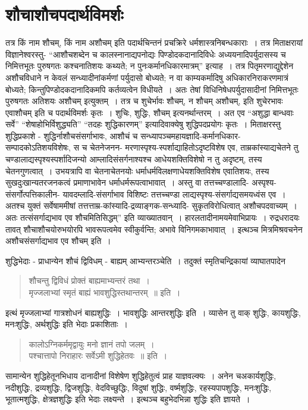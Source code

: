 {\section*{शौचाशौचपदार्थविमर्शः}

तत्र किं नाम शौचम्, किं नाम अशौचम् इति पदार्थचिन्तनं प्रचक्रिरे धर्मशास्त्रनिबन्ध\-काराः~। तत्र मिताक्षरायां विज्ञानेश्वरस्तु- “आशौचशब्देन च कालस्नानाद्यपनोद्यः पिण्डोदकदानादि\-विधेः अध्ययनादिपर्युदासस्य च निमित्तभूतः पुरुषगतः कश्चनातिशयः कथ्यते; न पुनः\break कर्मानधिकारमात्रम्” इत्याह~। तत्र पितृमरणाद्युद्देशेन अशौचविधाने न केवलं सन्ध्यादीनां\break कर्मणां पर्युदासो बोध्यते; न वा काम्यकर्मादिषु अधिकारनिराकरणमात्रं बोध्यते; किन्तु\break पिण्डोदकदानादिकमपि कर्तव्यत्वेन विधीयते~। अतः तेषां विधिनिषेधपर्युदासादीनां निमित्त\-भूतः पुरुषगतः अतिशयः अशौचम् इत्युक्तम्~। तत्र च शुचेर्भावः शौचम्, न शौचम् अशौचम्, इति शुचेरभावः एवाशौचम् इति च पदार्थविमर्शः कृतः~। शुचिः, शुद्धिः, शौचम् इत्यनर्थान्तरम्~। अत एव “अशुद्धा बान्धवाः सर्वे” “शेषाहोभिर्विशुद्ध्यति” “तदहः शुद्धिकारणम्” इत्यादिवाक्येषु शुद्धिपदप्रयोगः कृतः~। मिताक्षरस्तु शुद्धिप्रकाशे - शुद्धिर्नाशौच\-संसर्गाभावः, आशौचं च सन्ध्यापञ्चमहायज्ञादि-कर्मानधिकार-सम्पादकोऽतिशयविशेषः, स च चेतने\break जनन- मरणास्पृश्य-स्पर्शाद्याहितोऽदृष्टविशेष एव, ताम्रकांस्याद्यचेतने तु चण्डालाद्यस्पृश्यस्पर्शादिजन्यो आम्लादिसंसर्गनाश्यश्च आधेयशक्तिविशेषो न तु अदृष्टम्, तस्य चेतनगुणत्वात्~। उभयत्रापि वा चेतनाचेतनयोः धर्माधर्मविलक्षणाधेयशक्तिविशेष एवातिशयः, तस्य सुखदुःखान्यतरजनकत्वं प्रमाणाभावेन धर्माधर्मरूपत्वाभावात्~। अस्तु वा तत्तच्चण्डालादि- अस्पृश्य-संसर्गोत्पत्तिकालीन- यावदम्लादि-संसर्गाभाव\- विशिष्टः तत्तच्चण्डा लाद्यस्पृश्य-\break संसर्गाद्यसमयध्वंस एव~। अतश्च युक्तं सर्वेषाममीषां तत्तत्ताम्र-कांस्यादि-द्रव्याङ्गक-\break सन्ध्यादि- सुकृतविरोधित्वात् अशौचपदवाच्यम्~। अतः तत्संसर्गाद्यभाव एव शौचमिति\break सिद्धम्”  इति व्याख्यातवान्~। हारलतादीनामयमेवाभिप्रायः~। रुद्रधरादयः तावत् शौचाशौचयोरुभयोरपि भावरूपत्वमेव स्वीकुर्वन्ति; अभावे विनिगमकाभावात्~।  \hbox{इत्थञ्च} मित्रमिश्रवचनेन अशौचसंसर्गाद्यभाव एव शौचम् इति~। 

शुद्धिभेदाः - प्राधान्येन शौचं द्विविधम् - बाह्यम् आभ्यन्तरञ्चेति~। तदुक्तं स्मृतिचन्द्रिकायां व्याघातपादेन \enginline{-}
\begin{verse}
शौचन्तु द्विविधं प्रोक्तं बाह्यमाभ्यन्तरं तथा~। \\
मृज्जलाभ्यां स्मृतं बाह्यं भावशुद्धिस्तथान्तरम्~॥ इति~। 
\end{verse}
इत्थं मृज्जलाभ्यां गात्रशोधनं बाह्यशुद्धिः~। भावशुद्धिः आन्तरशुद्धिः इति~। व्यासेन तु वाक् शुद्धिः, कायशुद्धिः, मनःशुद्धिः, अर्थशुद्धिः इति भेदाः प्रकाशिताः~। 
\begin{verse}
कालोऽग्निकर्ममृद्वायुः मनो ज्ञानं तपो जलम्~। \\
पश्चात्तापो निराहारः सर्वेऽमी शुद्धिहेतवः~॥ इति~। 
\end{verse}
सामान्येन शुद्धिहेतूनभिधाय दानादीनां विशेषेण शुद्धिहेतुत्वं प्राह याज्ञवल्क्यः~। अनेन च\break अकार्यशुद्धिः, नदीशुद्धिः, द्रव्यशुद्धिः, द्विजशुद्धिः, वेदविच्छुद्धिः, विदुषां शुद्धिः, वर्ष्मशुद्धिः, रहस्यपापशुद्धिः, मनःशुद्धिः, भूतात्मशुद्धिः, क्षेत्रज्ञशुद्धिः इति भेदाः लक्ष्यन्ते~।  इत्थञ्च बहुभेदभिन्ना शुद्धिः इति ज्ञायते~। 
~\\[-1cm]
}
